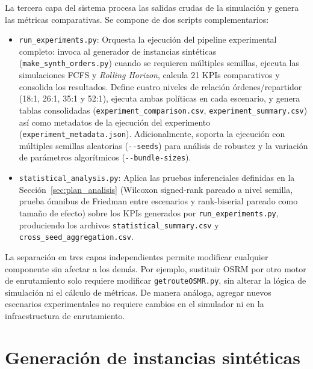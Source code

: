 \documentclass[12pt,letterpaper,oneside]{book}
\begin{document}
	La tercera capa del sistema procesa las salidas crudas de la simulación y genera las métricas 
	comparativas. Se compone de dos scripts complementarios:

	\begin{itemize}
		\item \texttt{run\_experiments.py}: Orquesta la ejecución del pipeline experimental 
		completo: invoca al generador de instancias sintéticas (\texttt{make\_synth\_orders.py}) 
		cuando se requieren múltiples semillas, ejecuta las simulaciones FCFS y \textit{Rolling Horizon},
		calcula 21 KPIs comparativos y consolida los resultados. Define cuatro niveles de 
		relación órdenes/repartidor (18:1, 26:1, 35:1 y 52:1), ejecuta ambas políticas en cada 
		escenario, y genera tablas consolidadas (\texttt{experiment\_comparison.csv}, 
		\texttt{experiment\_summary.csv}) así como metadatos de la ejecución del experimento
		(\texttt{experiment\_metadata.json}). Adicionalmente, soporta la ejecución con múltiples 
		semillas aleatorias (\texttt{-{}-seeds}) para análisis de robustez y la 
		variación de parámetros algorítmicos (\texttt{-{}-bundle-sizes}).
		\item \texttt{statistical\_analysis.py}: Aplica las pruebas inferenciales
		definidas en la Sección~\ref{sec:plan_analisis} (Wilcoxon signed-rank
		pareado a nivel semilla, prueba ómnibus de Friedman entre escenarios y
		rank-biserial pareado como tamaño de efecto) sobre los KPIs generados
		por \texttt{run\_experiments.py}, produciendo los archivos
		\texttt{statistical\_summary.csv} y \texttt{cross\_seed\_aggregation.csv}.
	\end{itemize}

	La separación en tres capas independientes permite modificar cualquier componente sin afectar a los 
	demás. Por ejemplo, sustituir OSRM por otro motor de enrutamiento solo requiere modificar 
	\texttt{getrouteOSMR.py}, sin alterar la lógica de simulación ni el cálculo de métricas. De manera 
	análoga, agregar nuevos escenarios experimentales no requiere cambios en el simulador ni en la 
	infraestructura de enrutamiento.

	\section{Generación de instancias sintéticas}
\end{document}
